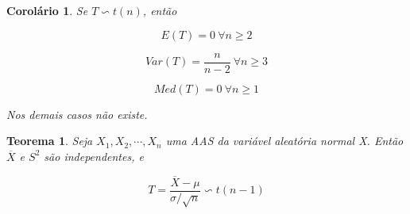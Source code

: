 \documentclass[12pt]{article}
\newtheorem{theorem}{Teorema}[section]
\newtheorem{corollary}{Corolário}[theorem]
\begin{document}
\begin{corollary}
    Se $T \backsim t(n)$, então 
    
    $$E(T) = 0 \ \forall n \geq 2$$
    
    $$Var(T) = \frac{n}{n-2} \ \forall n \geq 3$$
    
    $$Med(T) = 0 \ \forall n \geq 1$$
    
    Nos demais casos não existe.
\end{corollary}

\begin{theorem}
    Seja $X_1, X_2, \cdots, X_n$ uma AAS da variável aleatória normal X. Então $\overline{X}$ e $S^2$ são independentes, e
    
    $$T = \frac{\overline{X} - \mu}{\sigma / \sqrt{n}} \backsim t(n - 1)$$
\end{theorem}
\end{document}
